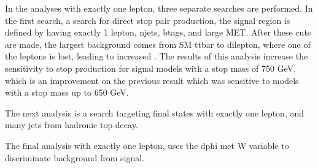 In the analyses with exactly one lepton, three separate searches are performed.
In the first search, a search for direct stop pair production, the signal region is defined by having
exactly 1 lepton, njets, btags, and large MET.
After these cuts are made, the largest background comes from SM ttbar to dilepton, where one of the leptons is lost, leading to increased \MET.
The results of this analysis increase the sensitivity to stop production for signal models with a stop mass of 750 GeV,
which is an improvement on the previous result which was sensitive to models with a stop mass up to 650 GeV.

The next analysis is a search targeting final states with exactly one lepton, and many jets from hadronic top decay.

The final analysis with exactly one lepton, uses the dphi met W variable to discriminate background from signal.
